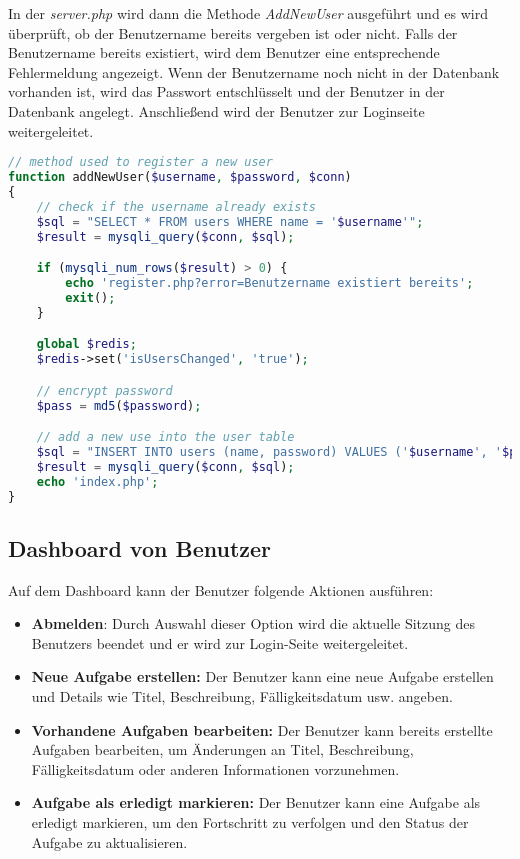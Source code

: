 In der \emph{server.php} wird dann die Methode \emph{AddNewUser} ausgeführt und es wird überprüft, ob der Benutzername bereits vergeben ist oder nicht. Falls der Benutzername bereits existiert, wird dem Benutzer eine entsprechende Fehlermeldung angezeigt. Wenn der Benutzername noch nicht in der Datenbank vorhanden ist, wird das Passwort entschlüsselt und der Benutzer in der Datenbank angelegt. Anschließend wird der Benutzer zur Loginseite weitergeleitet.

\begin{lstlisting}[language=PHP, caption=Methode für die Estellung eines neues Benutzers]
    // method used to register a new user
function addNewUser($username, $password, $conn)
{
    // check if the username already exists
    $sql = "SELECT * FROM users WHERE name = '$username'";
    $result = mysqli_query($conn, $sql);

    if (mysqli_num_rows($result) > 0) {
        echo 'register.php?error=Benutzername existiert bereits';
        exit();
    }

    global $redis;
    $redis->set('isUsersChanged', 'true');

    // encrypt password
    $pass = md5($password);

    // add a new use into the user table
    $sql = "INSERT INTO users (name, password) VALUES ('$username', '$pass')";
    $result = mysqli_query($conn, $sql);
    echo 'index.php';
}
\end{lstlisting}

\subsection{Dashboard von Benutzer}

Auf dem Dashboard kann der Benutzer folgende Aktionen ausführen:
\begin{itemize}
    \item \textbf{Abmelden}: Durch Auswahl dieser Option wird die aktuelle Sitzung des Benutzers beendet und er wird zur Login-Seite weitergeleitet.
    \item \textbf{Neue Aufgabe erstellen:} Der Benutzer kann eine neue Aufgabe erstellen und Details wie Titel, Beschreibung, Fälligkeitsdatum usw. angeben.
    \item \textbf{Vorhandene Aufgaben bearbeiten:} Der Benutzer kann bereits erstellte Aufgaben bearbeiten, um Änderungen an Titel, Beschreibung, Fälligkeitsdatum oder anderen Informationen vorzunehmen.
    \item \textbf{Aufgabe als erledigt markieren:} Der Benutzer kann eine Aufgabe als erledigt markieren, um den Fortschritt zu verfolgen und den Status der Aufgabe zu aktualisieren.
\end{itemize}

